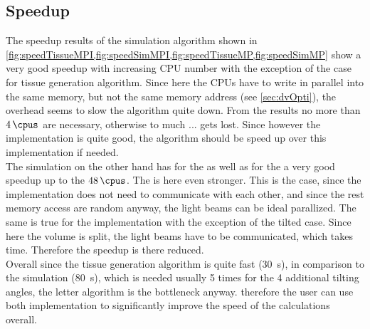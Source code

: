 \subsection{Speedup} 
% 
The speedup results of the simulation algorithm shown in \cref{fig:speedTissueMPI,fig:speedSimMPI,fig:speedTissueMP,fig:speedSimMP} show a very good speedup with increasing \ac{CPU} number with the exception of the \openmp{} case for tissue generation algorithm.
Since here the \acsp{CPU} have to write in parallel into the same memory, but not the same memory address (see \cref{sec:dvOpti}), the overhead seems to slow the algorithm quite down.
From the results no more than $\SI{4}{\cpus}$ are necessary, otherwise to much ... gets lost.
Since however the \mpi{} implementation is quite good, the algorithm should be speed up over this implementation if needed.
\\
% 
The simulation on the other hand has for the \mpi{} as well as for the \openmp{} a very good speedup up to the $\SI{48}{\cpus}$.
The \openmp{} is here even stronger.
This is the case, since the \openmp{} implementation does not need to communicate with each other, and since the rest memory access are random anyway, the light beams can be ideal parallized.
The same is true for the \mpi{} implementation with the exception of the tilted case. 
Since here the volume is split, the light beams have to be communicated, which takes time.
Therefore the speedup is there reduced.
\\
% 
Overall since the tissue generation algorithm is quite fast (\SI{30}{\second}), in comparison to the simulation (\SI{80}{\second}), which is needed usually 5 times for the 4 additional tilting angles, the letter algorithm is the bottleneck anyway.
therefore the user can use both implementation to significantly improve the speed of the calculations overall.
% 
% 
% 
